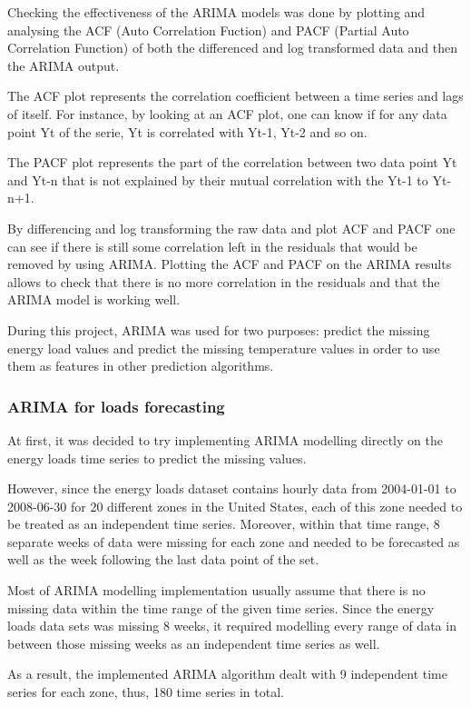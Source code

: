 \documentclass{article} %
\begin{document}
Checking the effectiveness of the ARIMA models was done by plotting and analysing the ACF (Auto Correlation Fuction) and PACF (Partial Auto Correlation Function) of both the differenced and log transformed data and then the ARIMA output.

The ACF plot represents the correlation coefficient between a time series and lags of itself. For instance, by looking at an ACF plot, one can know if for any data point Yt of the serie, Yt is correlated with Yt-1, Yt-2 and so on.

The PACF plot represents the part of the correlation between two data point Yt and Yt-n that is not explained by their mutual correlation with the Yt-1 to Yt-n+1.

By differencing and log transforming the raw data and plot ACF and PACF one can see if there is still some correlation left in the residuals that would be removed by using ARIMA. Plotting the ACF and PACF on the ARIMA results allows to check that there is no more correlation in the residuals and that the ARIMA model is working well.

During this project, ARIMA was used for two purposes: predict the missing energy load values and predict the missing temperature values in order to use them as features in other prediction algorithms. 

\subsubsection*{ARIMA for loads forecasting}

At first, it was decided to try implementing ARIMA modelling directly on the energy loads time series to predict the missing values. 

However, since the energy loads dataset contains hourly data from 2004-01-01 to 2008-06-30 for 20 different zones in the United States, each of this zone needed to be treated as an independent time series. Moreover, within that time range, 8 separate weeks of data were missing for each zone and needed to be forecasted as well as the week following the last data point of the set.

Most of ARIMA modelling implementation usually assume that there is no missing data within the time range of the given time series. Since the energy loads data sets was missing 8 weeks, it required modelling every range of data in between those missing weeks as an independent time series as well.

As a result, the implemented ARIMA algorithm dealt with 9 independent time series for each zone, thus, 180 time series in total.
\end{document}
